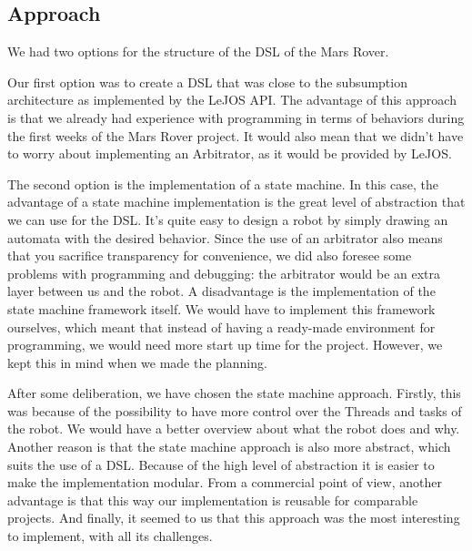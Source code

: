 \documentclass[11pt,a4paper]{article}
\begin{document}
\subsection{Approach}
We had two options for the structure of the DSL of the Mars Rover. 

Our first option was to create a DSL that was close to the subsumption architecture as implemented by the LeJOS API. The advantage of this approach is that we already had experience with programming in terms of behaviors during the first weeks of the Mars Rover project. It would also mean that we didn't have to worry about implementing an Arbitrator, as it would be provided by LeJOS.

The second option is the implementation of a state machine.
In this case, the advantage of a state machine implementation is the great level of abstraction that we can use for the DSL. 
It's quite easy to design a robot by simply drawing an automata with the desired behavior.
Since the use of an arbitrator also means that you sacrifice transparency for convenience, we did also foresee some problems with programming and debugging: the arbitrator would be an extra layer between us and the robot. 
A disadvantage is the implementation of the state machine framework itself. 
We would have to implement this framework ourselves, which meant that instead of having a ready-made environment for programming, we would need more start up time for the project. However, we kept this in mind when we made the planning.

After some deliberation, we have chosen the state machine approach.
Firstly, this was because of the possibility to have more control over the Threads and tasks of the robot. 
We would have a better overview about what the robot does and why. 
Another reason is that the state machine approach is also more abstract, which suits the use of a DSL. 
Because of the high level of abstraction it is easier to make the implementation modular. 
From a commercial point of view, another advantage is that this way our implementation is reusable for comparable projects. 
And finally, it seemed to us that this approach was the most interesting to implement, with all its challenges.
\end{document}
